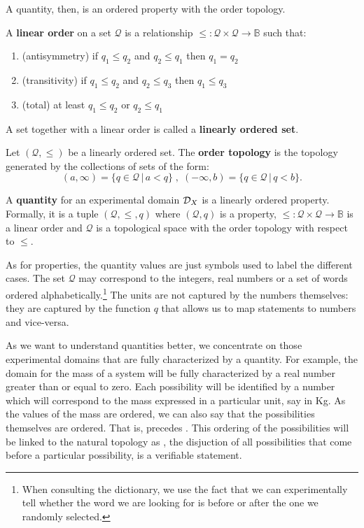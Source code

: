 \documentclass[11pt,letterpaper,fleqn]{memoir} %
\begin{document}
A quantity, then, is an ordered property with the order topology.

\begin{mathSection}
\begin{defn}
	A \textbf{linear order} on a set $\mathcal{Q}$ is a relationship $\leq : \mathcal{Q} \times \mathcal{Q} \to \mathbb{B}$ such that:
	\begin{enumerate}
		\item (antisymmetry) if $q_1 \leq q_2$ and $q_2 \leq q_1$ then $q_1 = q_2$
		\item (transitivity) if $q_1 \leq q_2$ and $q_2 \leq q_3$ then $q_1 \leq q_3$
		\item (total) at least $q_1 \leq q_2$ or $q_2 \leq q_1$
	\end{enumerate}
	A set together with a linear order is called a \textbf{linearly ordered set}.
\end{defn}
\begin{defn}
	Let $(\mathcal{Q}, \leq )$ be a linearly ordered set. The \textbf{order topology} is the topology generated by the collections of sets of the form:
	$$(a, \infty) = \{q \in \mathcal{Q} \, | \, a < q\} \;,\; (-\infty, b) = \{q \in \mathcal{Q} \, | \, q < b\}.$$
\end{defn}
\begin{defn}
	A \textbf{quantity} for an experimental domain $\mathcal{D}_X$ is a linearly ordered property. Formally, it is a tuple $(\mathcal{Q}, \leq, q)$ where $(\mathcal{Q}, q)$ is a property, $\leq : \mathcal{Q} \times \mathcal{Q} \to \mathbb{B}$ is a linear order and $\mathcal{Q}$ is a topological space with the order topology with respect to $\leq$.
\end{defn}
\end{mathSection}

As for properties, the quantity values are just symbols used to label the different cases. The set $\mathcal{Q}$ may correspond to the integers, real numbers or a set of words ordered alphabetically.\footnote{When consulting the dictionary, we use the fact that we can experimentally tell whether the word we are looking for is before or after the one we randomly selected.} The units are not captured by the numbers themselves: they are captured by the function $q$ that allows us to map statements to numbers and vice-versa.

As we want to understand quantities better, we concentrate on those experimental domains that are fully characterized by a quantity. For example, the domain for the mass of a system will be fully characterized by a real number greater than or equal to zero. Each possibility will be identified by a number which will correspond to the mass expressed in a particular unit, say in Kg. As the values of the mass are ordered, we can also say that the possibilities themselves are ordered. That is,  precedes . This ordering of the possibilities will be linked to the natural topology as , the disjuction of all possibilities that come before a particular possibility, is a verifiable statement.
\end{document}
